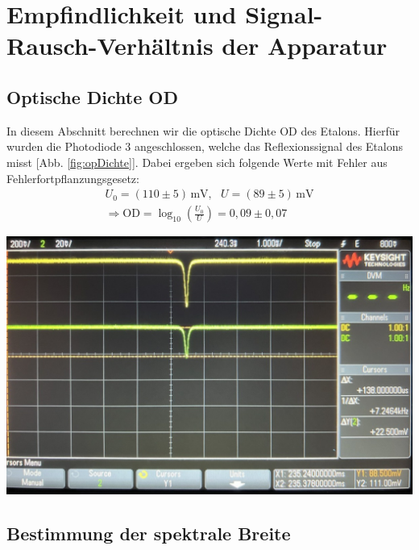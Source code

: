 \newpage

\section{Empfindlichkeit und Signal-Rausch-Verhältnis der Apparatur}
\label{sec:signalRausch}

\subsection{Optische Dichte OD}
\label{sub:opDichte}

In diesem Abschnitt berechnen wir die optische Dichte OD des Etalons. Hierfür wurden die Photodiode 3 angeschlossen, welche das Reflexionssignal des Etalons misst [Abb. \ref{fig:opDichte}]. Dabei ergeben sich folgende Werte mit Fehler aus Fehlerfortpflanzungsgesetz:
\begin{gather}
    U_0 = (110 \pm 5)\,\mathrm{mV}, ~~~U = (89 \pm 5)\,\mathrm{mV}\\[0,5cm]
    \Rightarrow \boxed{\mathrm{OD} = \log_{10}\left(\frac{U_0}{U}\right) = 0,09 \pm 0,07}
\end{gather} 

\begin{center}
    \captionsetup{type=figure}
    \includegraphics[scale=0.2]{Bilder/Signal-Rausch/signal-rausch_od.jpg}
    \label{fig:opDichte}
\end{center}

\subsection{Bestimmung der spektrale Breite}
\label{sub:specBreite}

